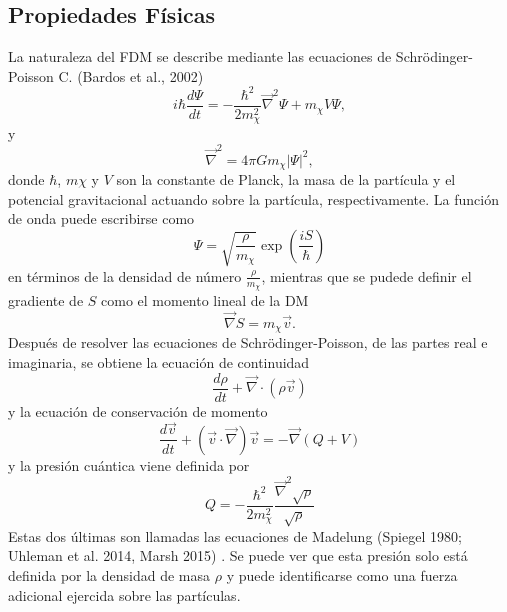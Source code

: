 \documentclass[a4paper,openright,12pt]{book}
\begin{document}
\subsection{Propiedades Físicas}
La naturaleza del FDM se describe mediante las ecuaciones de Schrödinger-Poisson C. (Bardos et al., 2002) \cite{3.1.1}
\begin{equation}
i\hbar \frac{d \Psi}{dt} 
=
-\frac{\hbar^{2}}{2m^{2}_{\chi}} \vec{\nabla}^{2}\Psi + m_{\chi}V\Psi,\label{eqn 3.1}
\end{equation}
y
\begin{equation}
\vec{\nabla}^{2} = 4\pi G m_{\chi}|\Psi|^{2},\label{eqn 3.2}
\end{equation}
donde $\hbar$, $m\chi$ y $V$ son la constante de Planck, la masa de la partícula y el potencial gravitacional actuando sobre la partícula, respectivamente. La función de onda puede escribirse como 
\begin{equation}
\Psi = \sqrt{\frac{\rho}{m_{\chi}}}\exp(\frac{iS}{\hbar})\label{eqn 3.3}
\end{equation}
en términos de la densidad de número $\frac{\rho}{m_{\chi}}$, mientras que se pudede definir el gradiente de $S$ como el momento lineal de la DM
\begin{equation}
\vec{\nabla}S = m_{\chi}\vec{v}.\label{eqn 3.4}
\end{equation}
Después de resolver las ecuaciones de Schrödinger-Poisson, de las partes real e imaginaria, se obtiene la ecuación de continuidad
\begin{equation}
\frac{d\rho}{dt} + \vec{\nabla}\cdot(\rho\vec{v})\label{eqn 3.5}
\end{equation}
y la ecuación de conservación de momento
\begin{equation}
\frac{d\vec{v}}{dt} + (\vec{v}\cdot\vec{\nabla})\vec{v} 
=
-\vec{\nabla}(Q + V) \label{eqn 3.6}
\end{equation}
y la presión cuántica viene definida por 
\begin{equation}
Q 
=
-\frac{\hbar^{2}}{2m^{2}_{\chi}}\frac{\vec{\nabla}^{2}\sqrt{\rho}}{\sqrt{\rho}}\label{eqn 3.7}
\end{equation}
Estas dos últimas son llamadas las ecuaciones de Madelung (Spiegel 1980; Uhleman et al. 2014, Marsh 2015) \cite{3.2, 3.3, 3.4}. Se puede ver que esta presión solo está definida por la densidad de masa $\rho$ y puede identificarse como una fuerza adicional ejercida sobre las partículas.
\end{document}
